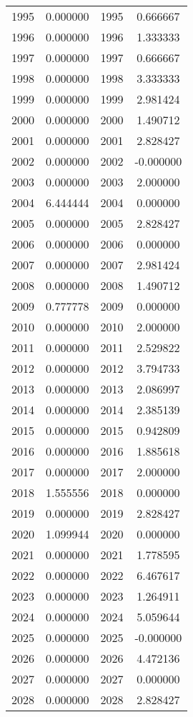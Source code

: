\documentclass[12pt]{article}
\begin{document}
\begin{longtable}{@{}cccc@{}}
1995 & 0.000000 & 1995 & 0.666667 \\
1996 & 0.000000 & 1996 & 1.333333 \\
1997 & 0.000000 & 1997 & 0.666667 \\
1998 & 0.000000 & 1998 & 3.333333 \\
1999 & 0.000000 & 1999 & 2.981424 \\
2000 & 0.000000 & 2000 & 1.490712 \\
2001 & 0.000000 & 2001 & 2.828427 \\
2002 & 0.000000 & 2002 & -0.000000 \\
2003 & 0.000000 & 2003 & 2.000000 \\
2004 & 6.444444 & 2004 & 0.000000 \\
2005 & 0.000000 & 2005 & 2.828427 \\
2006 & 0.000000 & 2006 & 0.000000 \\
2007 & 0.000000 & 2007 & 2.981424 \\
2008 & 0.000000 & 2008 & 1.490712 \\
2009 & 0.777778 & 2009 & 0.000000 \\
2010 & 0.000000 & 2010 & 2.000000 \\
2011 & 0.000000 & 2011 & 2.529822 \\
2012 & 0.000000 & 2012 & 3.794733 \\
2013 & 0.000000 & 2013 & 2.086997 \\
2014 & 0.000000 & 2014 & 2.385139 \\
2015 & 0.000000 & 2015 & 0.942809 \\
2016 & 0.000000 & 2016 & 1.885618 \\
2017 & 0.000000 & 2017 & 2.000000 \\
2018 & 1.555556 & 2018 & 0.000000 \\
2019 & 0.000000 & 2019 & 2.828427 \\
2020 & 1.099944 & 2020 & 0.000000 \\
2021 & 0.000000 & 2021 & 1.778595 \\
2022 & 0.000000 & 2022 & 6.467617 \\
2023 & 0.000000 & 2023 & 1.264911 \\
2024 & 0.000000 & 2024 & 5.059644 \\
2025 & 0.000000 & 2025 & -0.000000 \\
2026 & 0.000000 & 2026 & 4.472136 \\
2027 & 0.000000 & 2027 & 0.000000 \\
2028 & 0.000000 & 2028 & 2.828427 \\

\end{longtable}
\end{document}
